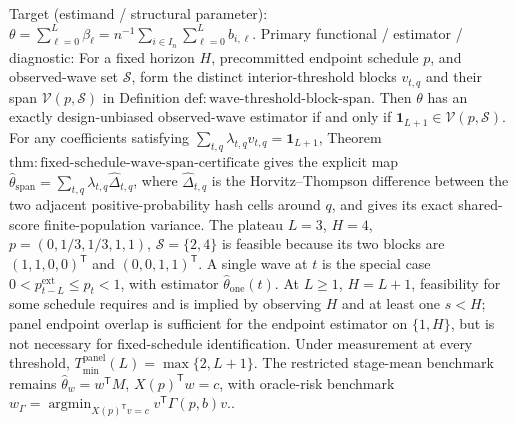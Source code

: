 \documentclass{article}
\begin{document}
Target (estimand / structural parameter): \(\theta=\sum_{\ell=0}^{L}\beta_\ell=n^{-1}\sum_{i\in I_n}\sum_{\ell=0}^{L}b_{i,\ell}\).
Primary functional / estimator / diagnostic: For a fixed horizon \(H\), precommitted endpoint schedule \(p\), and observed-wave set \(\mathcal S\), form the distinct interior-threshold blocks \(v_{t,q}\) and their span \(\mathcal V(p,\mathcal S)\) in Definition \(\mathrm{def:wave\text{-}threshold\text{-}block\text{-}span}\). Then \(\theta\) has an exactly design-unbiased observed-wave estimator if and only if \(\mathbf 1_{L+1}\in\mathcal V(p,\mathcal S)\). For any coefficients satisfying \(\sum_{t,q}\lambda_{t,q}v_{t,q}=\mathbf 1_{L+1}\), Theorem \(\mathrm{thm:fixed\text{-}schedule\text{-}wave\text{-}span\text{-}certificate}\) gives the explicit map \(\widehat\theta_{\mathrm{span}}=\sum_{t,q}\lambda_{t,q}\widehat\Delta_{t,q}\), where \(\widehat\Delta_{t,q}\) is the Horvitz--Thompson difference between the two adjacent positive-probability hash cells around \(q\), and gives its exact shared-score finite-population variance. The plateau \(L=3\), \(H=4\), \(p=(0,1/3,1/3,1,1)\), \(\mathcal S=\{2,4\}\) is feasible because its two blocks are \((1,1,0,0)^{\mathsf T}\) and \((0,0,1,1)^{\mathsf T}\). A single wave at \(t\) is the special case \(0<p^{\mathrm{ext}}_{t-L}\leq p_t<1\), with estimator \(\widehat\theta_{\mathrm{one}}(t)\). At \(L\geq1\), \(H=L+1\), feasibility for some schedule requires and is implied by observing \(H\) and at least one \(s<H\); panel endpoint overlap is sufficient for the endpoint estimator on \(\{1,H\}\), but is not necessary for fixed-schedule identification. Under measurement at every threshold, \(T_{\min}^{\mathrm{panel}}(L)=\max\{2,L+1\}\). The restricted stage-mean benchmark remains \(\widehat\theta_w=w^{\mathsf T}M\), \(X(p)^{\mathsf T}w=c\), with oracle-risk benchmark \(w_\Gamma=\operatorname*{argmin}_{X(p)^{\mathsf T}v=c}v^{\mathsf T}\Gamma(p,b)v\)..
\end{document}
